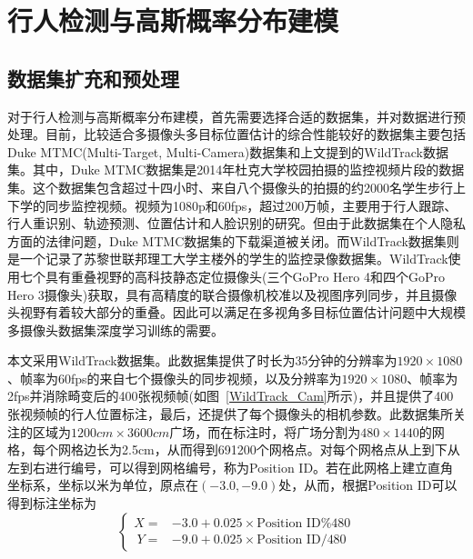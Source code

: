 
\chapter{行人检测与高斯概率分布建模}

\section{数据集扩充和预处理}

对于行人检测与高斯概率分布建模，首先需要选择合适的数据集，并对数据进行预处理。目前，比较适合多摄像头多目标位置估计的综合性能较好的数据集主要包括Duke MTMC(Multi-Target, Multi-Camera)数据集\cite{Ristani2016PerformanceMA}和上文提到的WildTrack数据集。其中，Duke MTMC数据集是2014年杜克大学校园拍摄的监控视频片段的数据集。这个数据集包含超过十四小时、来自八个摄像头的拍摄的约2000名学生步行上下学的同步监控视频。视频为1080p和60fps，超过200万帧，主要用于行人跟踪、行人重识别、轨迹预测、位置估计和人脸识别的研究。但由于此数据集在个人隐私方面的法律问题，Duke MTMC数据集的下载渠道被关闭。而WildTrack数据集则是一个记录了苏黎世联邦理工大学主楼外的学生的监控录像数据集。WildTrack使用七个具有重叠视野的高科技静态定位摄像头(三个GoPro Hero 4和四个GoPro Hero 3摄像头)获取，具有高精度的联合摄像机校准以及视图序列同步，并且摄像头视野有着较大部分的重叠。因此可以满足在多视角多目标位置估计问题中大规模多摄像头数据集深度学习训练的需要。

本文采用WildTrack数据集。此数据集提供了时长为35分钟的分辨率为$1920\times1080$、帧率为60fps的来自七个摄像头的同步视频，以及分辨率为$1920\times1080$、帧率为2fps并消除畸变后的400张视频帧(如图~\ref{WildTrack_Cam}所示)，并且提供了400张视频帧的行人位置标注，最后，还提供了每个摄像头的相机参数。此数据集所关注的区域为$1200cm\times3600cm$广场，而在标注时，将广场分割为$480\times1440$的网格，每个网格边长为2.5cm，从而得到691200个网格点。对每个网格点从上到下从左到右进行编号，可以得到网格编号，称为Position ID。若在此网格上建立直角坐标系，坐标以米为单位，原点在$(-3.0, -9.0)$处，从而，根据Position ID可以得到标注坐标为
\begin{equation}
  \left\{
    \begin{aligned}
    X = & -3.0 + 0.025 \times \text{Position ID} \% 480 \\\
    Y = & -9.0 + 0.025 \times \text{Position ID} / 480
    \end{aligned}
  \right.
\end{equation}


